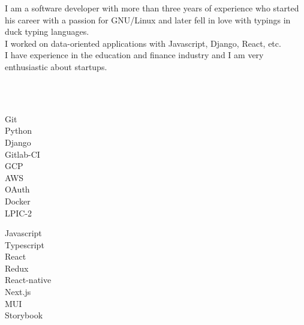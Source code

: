 \documentclass[9pt]{developercv}
\begin{document}
\begin{minipage}[t]{1\textwidth}
	\vspace{-\baselineskip}
	I am a software developer with more than three years of experience who started his career with a passion for GNU/Linux and later fell in love with typings in duck typing languages.\\
	I worked on data-oriented applications with Javascript, Django, React, etc. \\
	I have experience in the education and finance industry and I am very enthusiastic about startups.
\end{minipage}

\\\\
\begin{minipage}[t]{0.49\textwidth}
	\Large
	\vspace{-\baselineskip}

	\faCircle \; {Git}\\
	\faCircle \; {Python}\\
	\faCircle \; {Django}\\
	\faCircle \; {Gitlab-CI}\\
	\faCircle \; {GCP}\\
	\faCircle \; {AWS}\\
	\faCircle \; {OAuth}\\
	\faCircle \; {Docker}\\
	\faCircle \; {LPIC-2}\\
\end{minipage}
\begin{minipage}[t]{0.50\textwidth}
	\Large
	\vspace{-\baselineskip}

	\faCircle \; {Javascript}\\
	\faCircle \; {Typescript}\\
	\faCircle \; {React}\\
	\faCircle \; {Redux}\\
	\faCircle \; {React-native}\\
	\faCircle \; {Next.js}\\
	\faCircle \; {MUI}\\
	\faCircle \; {Storybook}\\
\end{minipage}
\end{document}
